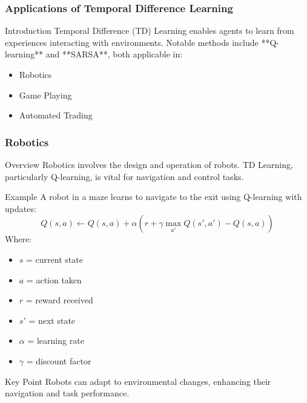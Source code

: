 \documentclass[aspectratio=169]{beamer}
\begin{document}
\begin{frame}[fragile]
    \frametitle{Applications of Temporal Difference Learning}
    \begin{block}{Introduction}
        Temporal Difference (TD) Learning enables agents to learn from experiences interacting with environments. 
        Notable methods include **Q-learning** and **SARSA**, both applicable in:
        \begin{itemize}
            \item Robotics
            \item Game Playing
            \item Automated Trading
        \end{itemize}
    \end{block}
\end{frame}

\begin{frame}[fragile]
    \frametitle{Robotics}
    \begin{block}{Overview}
        Robotics involves the design and operation of robots. TD Learning, particularly Q-learning, is vital for navigation and control tasks.
    \end{block}
    \begin{exampleblock}{Example}
        A robot in a maze learns to navigate to the exit using Q-learning with updates:
        \begin{equation}
            Q(s, a) \leftarrow Q(s, a) + \alpha \left( r + \gamma \max_{a'} Q(s', a') - Q(s, a) \right)
        \end{equation}
        Where:
        \begin{itemize}
            \item $s$ = current state
            \item $a$ = action taken
            \item $r$ = reward received
            \item $s'$ = next state
            \item $\alpha$ = learning rate
            \item $\gamma$ = discount factor
        \end{itemize}
    \end{exampleblock}
    \begin{block}{Key Point}
        Robots can adapt to environmental changes, enhancing their navigation and task performance.
    \end{block}
\end{frame}
\end{document}
